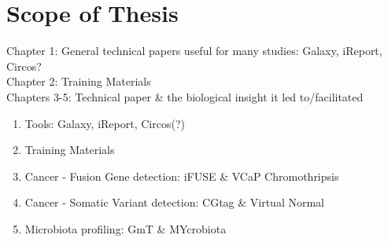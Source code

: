 \chapter*{Scope of Thesis}

Chapter 1: General technical papers useful for many studies: Galaxy, iReport, Circos? \\
Chapter 2: Training Materials \\
Chapters 3-5: Technical paper \& the biological insight it led to/facilitated \\

\begin{enumerate}
    \item Tools: Galaxy, iReport, Circos(?)
    \item Training Materials
    \item Cancer - Fusion Gene detection: iFUSE \& VCaP Chromothripsis
    \item Cancer - Somatic Variant detection: CGtag \& Virtual Normal
    \item Microbiota profiling: GmT \& MYcrobiota
\end{enumerate}
